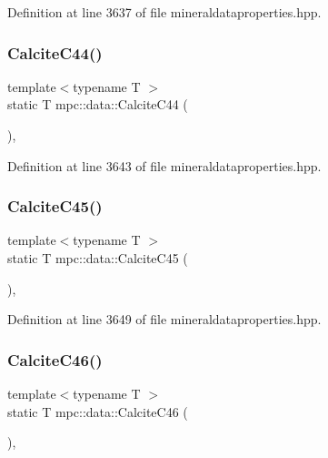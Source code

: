 Definition at line 3637 of file mineraldataproperties.\+hpp.

\mbox{\label{namespacempc_1_1data_a0efde002d791ab3844c9784ddb682f2b}} 
\subsubsection{\texorpdfstring{Calcite\+C44()}{CalciteC44()}}
{\footnotesize\ttfamily template$<$typename T $>$ \\
static T mpc\+::data\+::\+Calcite\+C44 (\begin{DoxyParamCaption}{ }\end{DoxyParamCaption})\hspace{0.3cm}{\ttfamily [inline]}, {\ttfamily [static]}}



Definition at line 3643 of file mineraldataproperties.\+hpp.

\mbox{\label{namespacempc_1_1data_a06cc4616eb188aabbcd5733bfdeecbf1}} 
\subsubsection{\texorpdfstring{Calcite\+C45()}{CalciteC45()}}
{\footnotesize\ttfamily template$<$typename T $>$ \\
static T mpc\+::data\+::\+Calcite\+C45 (\begin{DoxyParamCaption}{ }\end{DoxyParamCaption})\hspace{0.3cm}{\ttfamily [inline]}, {\ttfamily [static]}}



Definition at line 3649 of file mineraldataproperties.\+hpp.

\mbox{\label{namespacempc_1_1data_a8fc6500ce0bc5da6ed29b754e039bbbc}} 
\subsubsection{\texorpdfstring{Calcite\+C46()}{CalciteC46()}}
{\footnotesize\ttfamily template$<$typename T $>$ \\
static T mpc\+::data\+::\+Calcite\+C46 (\begin{DoxyParamCaption}{ }\end{DoxyParamCaption})\hspace{0.3cm}{\ttfamily [inline]}, {\ttfamily [static]}}



